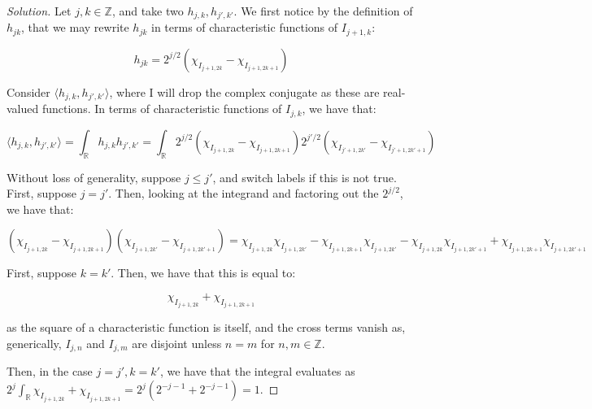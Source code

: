 \documentclass[10pt]{article}
\begin{document}
\begin{proof}[Solution]


Let $j, k \in\mathbb{Z}$, and take two $h_{j,k}, h_{j', k'}$. We first notice by the definition of $h_{jk}$, that we may rewrite $h_{jk}$ in terms of characteristic functions of $I_{j+1, k}$:

$$ h_{jk} = 2^{j/2} (\chi_{I_{j+1, 2k}} - \chi_{I_{j+1, 2k+1}} ) $$


Consider $\langle h_{j,k}, h_{j', k'} \rangle$, where I will drop the complex conjugate as these are real-valued functions. In terms of characteristic functions of $I_{j,k}$, we have that:

$$  \langle h_{j,k}, h_{j', k'} \rangle = \int_{\mathbb{R}}  h_{j,k}  h_{j', k'} = \int_{\mathbb{R}}  2^{j/2} (\chi_{I_{j+1, 2k}} - \chi_{I_{j+1, 2k+1}} ) 2^{j'/2} (\chi_{I_{j'+1, 2k'}} - \chi_{I_{j'+1, 2k'+1}} )$$

Without loss of generality, suppose $j \leq j'$, and switch labels if this is not true. First, suppose $j = j'$. Then, looking at the integrand and factoring out the $2^{j/2}$, we have that:

$$  (\chi_{I_{j+1, 2k}} - \chi_{I_{j+1, 2k+1}} )  (\chi_{I_{j+1, 2k'}} - \chi_{I_{j+1, 2k'+1}} ) = \chi_{I_{j+1, 2k}}\chi_{I_{j+1, 2k'}} - \chi_{I_{j+1, 2k+1}}\chi_{I_{j+1, 2k'}} - \chi_{I_{j+1, 2k}}\chi_{I_{j+1, 2k'+1}} + \chi_{I_{j+1, 2k+1}} \chi_{I_{j+1, 2k'+1}}  $$

First, suppose $k = k'$. Then, we have that this is equal to:

$$ \chi_{I_{j+1, 2k}} +  \chi_{I_{j+1, 2k+1}} $$

as the square of a characteristic function is itself, and the cross terms vanish as, generically, $I_{j,n}$ and $I_{j, m}$ are disjoint unless $n = m$ for $n,m \in \mathbb{Z}$.

Then, in the case $j = j', k = k'$, we have that the integral evaluates as $2^j \int_{\mathbb{R}}  \chi_{I_{j+1, 2k}} +  \chi_{I_{j+1, 2k+1}} = 2^j( 2^{-j-1} + 2^{ -j -1} ) =  1$.


\end{proof}
\end{document}
